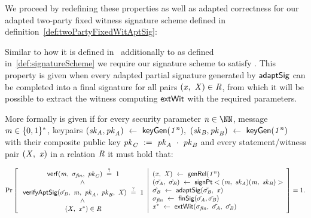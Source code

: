 We proceed by redefining these properties as well as adapted correctness for our adapted two-party fixed witness signature scheme defined in definition~\ref{def:twoPartyFixedWitAptSig}:

\begin{definition}[\cnstAptSigCorrectness]\label{def:aptSigCorrectness}
Similar to how it is defined in~\cite{aumayr2020bitcoinchannels} additionally to \cnstCorrectness as defined in~\ref{def:signatureScheme} we require our signature scheme to satisfy \cnstAptSigCorrectness.
This property is given when every adapted partial signature generated by $\mathsf{adaptSig}$ can be completed into a final signature for all pairs $(\mathit{x} ,~ \mathit{X}) \in \mathit{R}$, from which it will
be possible to extract the witness computing $\mathsf{extWit}$ with the required parameters.

More formally \cnstAptSigCorrectness is given if for every security parameter $\varN \in \cnstNatural$, message $\mathit{m} \in \{0,1\}^{*}$, keypairs $(\mathit{sk}_{\mathit{A}}, \mathit{pk}_{\mathit{A}}) ~\leftarrow~ \mathsf{keyGen}(\mathit{1^n}) ,~
(\mathit{sk}_{\mathit{B}}, \mathit{pk}_{\mathit{B}}) ~\leftarrow~ \mathsf{keyGen}(\mathit{1^n})$
with their composite public key $\mathit{pk}_{\mathit{C}} ~:=~ \mathit{pk}_{\mathit{A}} ~\cdot~ \mathit{pk}_{\mathit{B}}$ 
 and every statement/witness pair $(\mathit{X} ,~ \mathit{x})$ in a relation $\mathit{R}$ it must hold that:
 
\[
    \Pr\left[
    \begin{array}{c}
        \:\mathsf{verf}(\mathit{m} ,~ \sigma_{\mathit{fin}} ,~ \mathit{pk}_{\mathit{C}}) ~\stackrel{?}{=}~ 1 \\
        ~\land~ \\
        \: \mathsf{verifyAptSig}(\hat{\sigma_{\mathit{B}}} ,~ \mathit{m} ,~ \mathit{pk}_{\mathit{A}} ,~ \mathit{pk}_{\mathit{B}} ,~ \mathit{X}) ~\stackrel{?}{=}~ 1 \\
        ~\land~ \\
        \:(\mathit{X} ,~ \mathit{x}^*) \in \mathit{R}
    \end{array}
    \middle\vert
    \begin{array}{l}
        (\mathit{x} ,~ \mathit{X}) ~\leftarrow~ \mathsf{genRel}(\mathit{1^n}) \\
        (\tilde{\sigma_{\mathit{A}}} ,~ \tilde{\sigma_{\mathit{B}}}) ~\leftarrow~ \mathsf{signPt}<(\mathit{m} ,~ \mathit{sk}_{\mathit{A}})(\mathit{m} ,~ \mathit{sk}_{\mathit{B}})> \\
        \hat{\sigma_{\mathit{B}}} ~\leftarrow~ \mathsf{adaptSig}(\tilde{\sigma_{\mathit{B}}} ,~ \mathit{x}) \\
        \sigma_{\mathit{fin}} ~\leftarrow~ \mathsf{finSig}(\tilde{\sigma_{\mathit{A}}},\tilde{\sigma_{\mathit{B}}}) \\
        \mathit{x}^* ~\leftarrow~ \mathsf{extWit}(\sigma_{\mathit{fin}} ,~ \tilde{\sigma_{\mathit{A}}} ,~ \hat{\sigma_{\mathit{B}}})
    \end{array}
    \right]=1.
\]
\end{definition}

